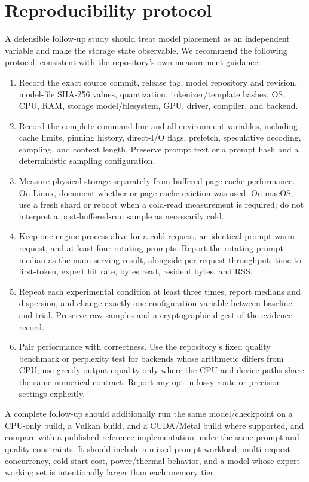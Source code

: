 \documentclass[10pt,twocolumn]{article}
\newcommand{\code}[1]{\texttt{\small\detokenize{#1}}}
\begin{document}
\section{Reproducibility protocol}
A defensible follow-up study should treat model placement as an independent variable and make the storage state observable. We recommend the following protocol, consistent with the repository's own measurement guidance:
\begin{enumerate}
  \item Record the exact source commit, release tag, model repository and revision, model-file SHA-256 values, quantization, tokenizer/template hashes, OS, CPU, RAM, storage model/filesystem, GPU, driver, compiler, and backend.
  \item Record the complete command line and all environment variables, including cache limits, pinning history, direct-I/O flags, prefetch, speculative decoding, sampling, and context length. Preserve prompt text or a prompt hash and a deterministic sampling configuration.
  \item Measure physical storage separately from buffered page-cache performance. On Linux, document whether \code{O\_DIRECT} or page-cache eviction was used. On macOS, use a fresh shard or reboot when a cold-read measurement is required; do not interpret a post-buffered-run \code{F\_NOCACHE} sample as necessarily cold.
  \item Keep one engine process alive for a cold request, an identical-prompt warm request, and at least four rotating prompts. Report the rotating-prompt median as the main serving result, alongside per-request throughput, time-to-first-token, expert hit rate, bytes read, resident bytes, and RSS.
  \item Repeat each experimental condition at least three times, report medians and dispersion, and change exactly one configuration variable between baseline and trial. Preserve raw samples and a cryptographic digest of the evidence record.
  \item Pair performance with correctness. Use the repository's fixed quality benchmark or perplexity test for backends whose arithmetic differs from CPU; use greedy-output equality only where the CPU and device paths share the same numerical contract. Report any opt-in lossy route or precision settings explicitly.
\end{enumerate}

A complete follow-up should additionally run the same model/checkpoint on a CPU-only build, a Vulkan build, and a CUDA/Metal build where supported, and compare with a published reference implementation under the same prompt and quality constraints. It should include a mixed-prompt workload, multi-request concurrency, cold-start cost, power/thermal behavior, and a model whose expert working set is intentionally larger than each memory tier.
\end{document}
